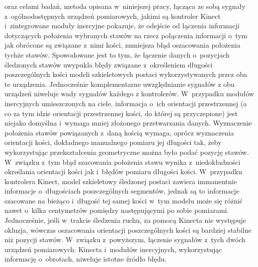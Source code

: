 oraz celami badań, metoda opisana w~niniejszej pracy, łącząca ze sobą sygnały z~ogólnodostępnych urządzeń pomiarowych, jakimi są kontroler Kinect i~zintegrowane moduły inercyjne pokazuje, że odejście od łączenia informacji dotyczących położenia wybranych stawów na rzecz połączenia informacji o~tym jak obrócone są związane z~nimi kości, zmniejsza błąd oszacowania położenia tychże stawów. Spowodowane jest to tym, że łączenie danych o~pozycjach śledzonych stawów uwypukla błędy związane z~określeniem długości poszczególnych kości modeli szkieletowych postaci wykorzystywanych przez oba te urządzenia. Jednocześnie komplementarne uwzględnianie sygnałów z obu urządzeń niweluje wady sygnałów każdego z kontrolerów. W~przypadku modułów inercyjnych umieszczonych na ciele, informacja o~ich orientacji przestrzennej (a co za tym idzie orientacji przestrzennej kości, do której są przyczepione) jest niejako domyślna i~wymaga mniej złożonego przetwarzania danych. Wyznaczenie położenia stawów powiązanych z~daną kością wymaga, oprócz wyznaczenia orientacji kości, dokładnego manualnego pomiaru jej długości tak, żeby wykorzystując przekształcenia geometryczne można było podać pozycję stawów. W~związku z~tym błąd szacowania położenia stawu wynika z~niedokładności określania orientacji kości jak i~błędów pomiaru długości kości. W~przypadku kontrolera Kinect, model szkieletowy śledzonej postaci zawiera immanentnie informacje o~długościach poszczególnych segmentów, jednak są to informacje szacowane na bieżąco i~długość tej samej kości w~tym modelu może się różnić nawet o~kilka centymetrów pomiędzy następującymi po sobie pomiarami. Jednocześnie, jeśli w~trakcie śledzenia ruchu, za pomocą Kinecta nie występuje okluzja, wówczas oszacowania orientacji poszczególnych kości są bardziej stabilne niż pozycji stawów. W~związku z~powyższym, łączenie sygnałów z~tych dwóch urządzeń pomiarowych: Kinecta i~modułów inercyjnych, wykorzystując informację o~obrotach, niweluje istotne źródło błędu.


